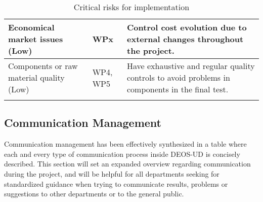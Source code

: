 \begin{longtable}[H]{>{\raggedright\arraybackslash}p{4cm} p{4.7cm} p{5cm}}
	\midrule
	
	Economical market issues (Low) & WPx & Control cost evolution due to external changes throughout the project. \vspace{0.2cm} \\
	
	\midrule
	
	Components or raw material quality (Low) & WP4, WP5 & Have exhaustive and regular quality controls to avoid problems in components in the final test. \vspace{0.2cm} \\
	
	\bottomrule[2pt]
	
	\caption{Critical risks for implementation}
	\label{workpackages}
\end{longtable}

\subsection{Communication Management}

Communication management has been effectively synthesized in a table where each and every type of communication process inside DEOS-UD is concisely described. This section will set an expanded overview regarding communication during the project, and will be helpful for all departments seeking for standardized guidance when trying to communicate results, problems or suggestions to other departments or to the general public. 

